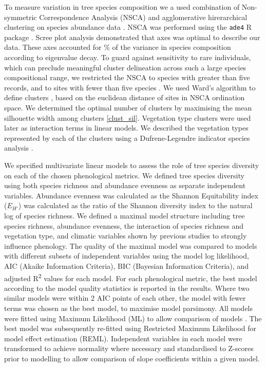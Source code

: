 \documentclass[11pt,a4paper]{article}
\begin{document}
To measure variation in tree species composition we a used combination of Non-symmetric Correspondence Analysis (NSCA) and agglomerative hirerarchical clustering on species abundance data \citep{Kreft2010, Fayolle2014}. NSCA was performed using the \texttt{ade4} R package \citep{ade4}. Scree plot analysis demonstrated that \nscaAxes{} axes was optimal to describe our data. These axes accounted for \nscaInertia{}\% of the variance in species composition according to eigenvalue decay. To guard against sensitivity to rare individuals, which can preclude meaningful cluster delineation across such a large species compositional range, we restricted the NSCA to species with greater than five records, and to sites with fewer than five species \citep{}. We used Ward's algorithm to define clusters \citep{Murtagh2014}, based on the euclidean distance of sites in NSCA ordination space. We determined the optimal number of clusters by maximising the mean silhouette width among clusters \citep{Rousseeuw1987} \autoref{clust_sil}. Vegetation type clusters were used later as interaction terms in linear models. We described the vegetation types represented by each of the clusters using a Dufrene-Legendre indicator species analysis \citep{Dufrene1997}.

We specified multivariate linear models to assess the role of tree species diversity on each of the chosen phenological metrics. We defined tree species diversity using both species richness and abundance evenness as separate independent variables. Abundance evenness was calculated as the Shannon Equitability index ($E_{H'}$) \citep{Smith1996} was calculated as the ratio of the Shannon diversity index to the natural log of species richness. We defined a maximal model structure including tree species richness, abundance evenness, the interaction of species richness and vegetation type, and climatic variables shown by previous studies to strongly influence phenology. The quality of the maximal model was compared to models with different subsets of independent variables using the model log likelihood, AIC (Akaike Information Criteria), BIC (Bayesian Information Criteria), and adjusted R\textsuperscript{2} values for each model. For each phenological metric, the best model according to the model quality statistics is reported in the results. Where two similar models were within 2 AIC points of each other, the model with fewer terms was chosen as the best model, to maximise model parsimony. All models were fitted using Maximum Likelihood (ML) to allow comparison of models \citep{}. The best model was subsequently re-fitted using Restricted Maximum Likelihood for model effect estimation (REML). Independent variables in each model were transformed to achieve normality where necessary and standardised to Z-scores prior to modelling to allow comparison of slope coefficients within a given model. 
\end{document}

